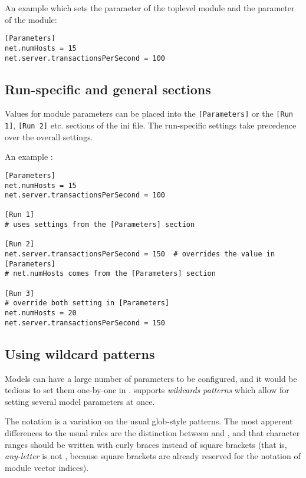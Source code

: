 An example  which sets the  parameter of
the toplevel module and the  parameter of the
 module:

\begin{verbatim}
[Parameters]
net.numHosts = 15
net.server.transactionsPerSecond = 100
\end{verbatim}


\subsection{Run-specific and general sections}

Values for module parameters can be placed into the \texttt{[Parameters]}
or the \texttt{[Run 1]}, \texttt{[Run 2]} etc. sections of the ini file.
The run-specific settings take precedence over the overall settings.

An example :

\begin{verbatim}
[Parameters]
net.numHosts = 15
net.server.transactionsPerSecond = 100

[Run 1]
# uses settings from the [Parameters] section

[Run 2]
net.server.transactionsPerSecond = 150  # overrides the value in [Parameters]
# net.numHosts comes from the [Parameters] section

[Run 3]
# override both setting in [Parameters]
net.numHosts = 20
net.server.transactionsPerSecond = 150
\end{verbatim}



\subsection{Using wildcard patterns}
\label{sec:ch-run-sim:wildcards}

Models can have a large number of parameters to be configured, and it would
be tedious to set them one-by-one in . {\opp} supports
\textit{wildcards patterns} which allow for setting several model parameters
at once.

The notation is a variation on the usual glob-style patterns.
The most apperent differences to the usual rules are the distinction between
\ttt{*} and \ttt{**}, and that character ranges should be written
with curly braces instead of square brackets (that is, \textit{any-letter}
is  not \ttt{[a-zA-Z]}, because square brackets are
already reserved for the notation of module vector indices).

